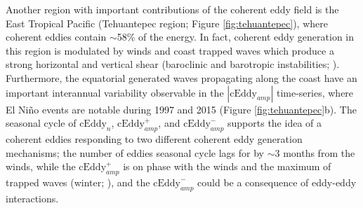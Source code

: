 \documentclass[draft,linenumbers]{agujournal2019}
\newcommand{\cEddy}{\textrm{cEddy}}
\begin{document}

	Another region with important contributions of the coherent eddy field is the East Tropical Pacific (Tehuantepec region; Figure \ref{fig:tehuantepec}), where coherent eddies contain $\sim$58\% of the energy. 
	In fact, coherent eddy generation in this region is modulated by winds and coast trapped waves which produce a strong horizontal and vertical shear (baroclinic and barotropic instabilities; \citealp{Zamudio_Tehuantepec_2006}). 
	Furthermore, the equatorial generated waves propagating along the coast have an important interannual variability observable in the $|\cEddy_{amp}|$ time-series, where El Niño events are notable during 1997 and 2015 (Figure \ref{fig:tehuantepec}b). 
	The seasonal cycle of $\cEddy_{n}$, $\cEddy_{amp}^+$, and $\cEddy_{amp}^-$ supports the idea of a coherent eddies responding to two different coherent eddy generation mechanisms; the number of eddies seasonal cycle lags for by $\sim$3 months from the winds, while the $\cEddy_{amp}^+$ is on phase with the winds and the maximum of trapped waves (winter; \citealp{Zamudio_Tehuantepec_2006}), and the $\cEddy_{amp}^-$ could be a consequence of eddy-eddy interactions. 
	

\end{document}
